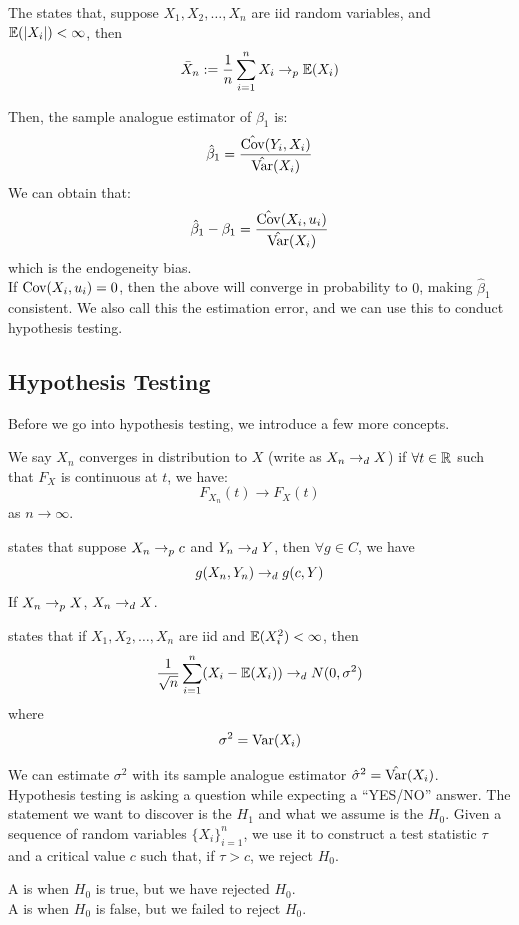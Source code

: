 \begin{theorem}
    The  states that, suppose $X_1, X_2, \dots, X_n$ are iid random variables, and $\mathbb{E}(\abs{X_i}) < \infty$, then
    $$\bar{X}_n := \frac{1}{n}\sum_{i = 1}^{n} X_i \to_p \mathbb{E}(X_i)$$
\end{theorem}
Then, the sample analogue estimator of $\beta_1$ is:
$$\hat{\beta}_1 = \frac{\hat{\text{Cov}}(Y_i, X_i)}{\hat{\text{Var}}(X_i)}$$
We can obtain that:
$$\hat{\beta}_1 - \beta_1 = \frac{\hat{\text{Cov}}(X_i, u_i)}{\hat{\text{Var}}(X_i)}$$
which is the endogeneity bias. \\
If $\text{Cov}(X_i, u_i) = 0$, then the above will converge in probability to $0$, making $\hat{\beta}_1$ consistent. We also call this the estimation error, and we can use this to conduct hypothesis testing.

\subsection{Hypothesis Testing}
Before we go into hypothesis testing, we introduce a few more concepts.
\begin{definition}
    We say $X_n$ converges in distribution to $X$ (write as $X_n \to_d X$) if $\forall t \in \mathbb{R}$ such that $F_X$ is continuous at $t$, we have:
    $$F_{X_n}(t) \to F_X(t)$$
    as $n \to \infty$.
\end{definition}
\begin{lemma}
     states that suppose $X_n \to_p c$ and $Y_n \to_d Y$, then $\forall g \in C$, we have
    $$g(X_n, Y_n) \to_d g(c, Y)$$
    If $X_n \to_p X$, $X_n \to_d X$.
\end{lemma}
\begin{theorem}
     states that if $X_1, X_2, \dots, X_n$ are iid and $\mathbb{E}(X_i^2) < \infty$, then
    $$\frac{1}{\sqrt{n}} \sum_{i = 1}^{n} (X_i - \mathbb{E}(X_i)) \to_d N(0, \sigma^2)$$
    where
    $$\sigma^2 = \text{Var}(X_i)$$
\end{theorem}
We can estimate $\sigma^2$ with its sample analogue estimator $\hat{\sigma}^2 = \hat{\text{Var}}(X_i)$. \\
Hypothesis testing is asking a question while expecting a ``YES/NO'' answer. The statement we want to discover is the  $H_1$ and what we assume is the  $H_0$. Given a sequence of random variables $\{X_i\}_{i = 1}^n$, we use it to construct a test statistic $\tau$ and a critical value $c$ such that, if $\tau > c$, we reject $H_0$.
\begin{definition}
    A  is when $H_0$ is true, but we have rejected $H_0$. \\
    A  is when $H_0$ is false, but we failed to reject $H_0$.
\end{definition}
